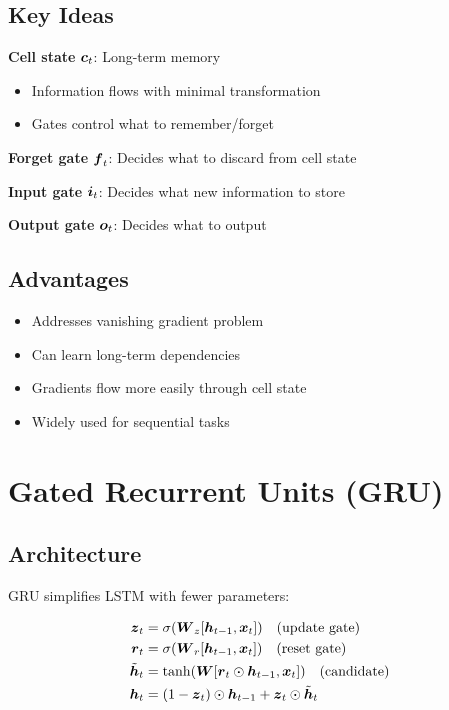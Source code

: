 \subsection{Key Ideas}

\textbf{Cell state} $\boldsymbol{c}_t$: Long-term memory
\begin{itemize}
    \item Information flows with minimal transformation
    \item Gates control what to remember/forget
\end{itemize}

\textbf{Forget gate} $\boldsymbol{f}_t$: Decides what to discard from cell state

\textbf{Input gate} $\boldsymbol{i}_t$: Decides what new information to store

\textbf{Output gate} $\boldsymbol{o}_t$: Decides what to output

\subsection{Advantages}

\begin{itemize}
    \item Addresses vanishing gradient problem
    \item Can learn long-term dependencies
    \item Gradients flow more easily through cell state
    \item Widely used for sequential tasks
\end{itemize}

\section{Gated Recurrent Units (GRU)}
\label{sec:gru}

\subsection{Architecture}

GRU simplifies LSTM with fewer parameters:

\begin{align}
\boldsymbol{z}_t &= \sigma(\boldsymbol{W}_z [\boldsymbol{h}_{t-1}, \boldsymbol{x}_t]) \quad \text{(update gate)} \\
\boldsymbol{r}_t &= \sigma(\boldsymbol{W}_r [\boldsymbol{h}_{t-1}, \boldsymbol{x}_t]) \quad \text{(reset gate)} \\
\tilde{\boldsymbol{h}}_t &= \tanh(\boldsymbol{W} [\boldsymbol{r}_t \odot \boldsymbol{h}_{t-1}, \boldsymbol{x}_t]) \quad \text{(candidate)} \\
\boldsymbol{h}_t &= (1 - \boldsymbol{z}_t) \odot \boldsymbol{h}_{t-1} + \boldsymbol{z}_t \odot \tilde{\boldsymbol{h}}_t
\end{align}

